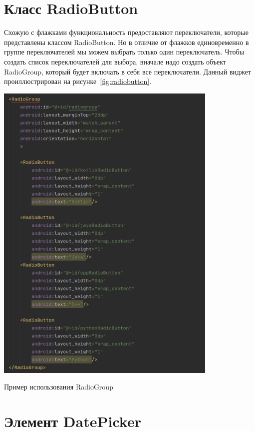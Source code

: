 \section{Класс RadioButton}
Схожую с флажками функциональность предоставляют 
переключатели, которые представлены классом RadioButton. Но в отличие от 
флажков единовременно в группе переключателей мы можем выбрать только 
один переключатель. Чтобы создать список переключателей для выбора, 
вначале надо создать объект RadioGroup, который будет включать в себя все 
переключатели.
Данный виджет проиллюстрирован на рисунке~\ref{fig:radiobutton}.

\begin{image}
	\includegraphics[width=0.8\textwidth]{Screenshot from 2023-03-25 18-03-35.png}
	\caption{Пример использования RadioGroup}
	\label{fig:radiobutton}
\end{image}

\section{Элемент DatePicker}


